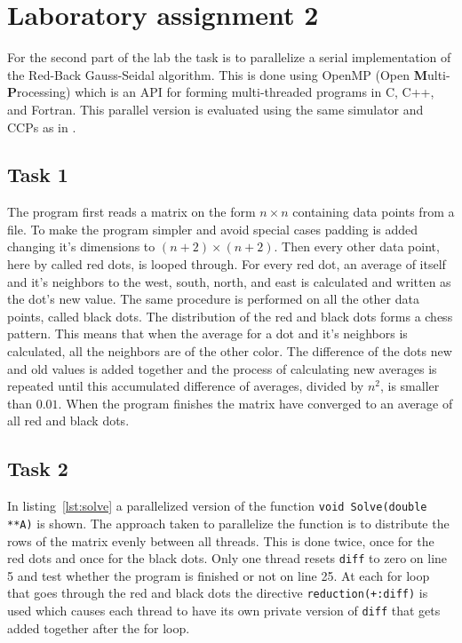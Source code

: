 \section{Laboratory assignment 2}
\label{sec:lab2}
For the second part of the lab the task is to parallelize a serial implementation of the Red-Back Gauss-Seidal algorithm. This is done using OpenMP (Open \textbf Multi-\textbf Processing) which is an API for forming multi-threaded programs in C, C++, and Fortran. This parallel version is evaluated using the same simulator and CCPs as in . 

\subsection{Task 1}
The program first reads a matrix on the form $n \times n$ containing data points from a file. To make the program simpler and avoid special cases padding is added changing it's dimensions to $(n+2) \times (n+2)$. Then every other data point, here by called red dots, is looped through. For every red dot, an average of itself and it's neighbors to the west, south, north, and east is calculated and written as the dot's new value. The same procedure is performed on all the other data points, called black dots. The distribution of the red and black dots forms a chess pattern. This means that when the average for a dot and it's neighbors is calculated, all the neighbors are of the other color. The difference of the dots new and old values is added together and the process of calculating new averages is repeated until this accumulated difference of averages, divided by $n^2$, is smaller than $0.01$. When the program finishes the matrix have converged to an average of all red and black dots.

\subsection{Task 2}
\label{subsec:lab2:task2}
In listing~\ref{lst:solve} a parallelized version of the function \texttt{void Solve(double **A)} is shown. The approach taken to parallelize the function is to distribute the rows of the matrix evenly between all threads. This is done twice, once for the red dots and once for the black dots. Only one thread resets \texttt{diff} to zero on line 5 and test whether the program is finished or not on line 25. At each for loop that goes through the red and black dots the directive \texttt{reduction(+:diff)} is used which causes each thread to have its own private version of \texttt{diff} that gets added together after the for loop.

